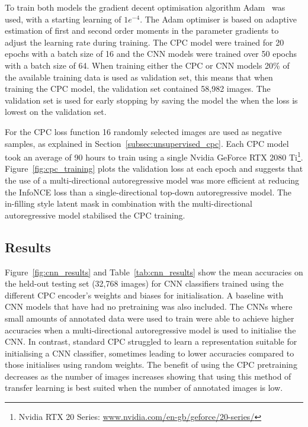 To train both models the gradient decent optimisation algorithm Adam~\citep{kingma2014adam} was used, with a starting learning of $1e^{-4}$. The Adam optimiser is based on adaptive estimation of first and second order moments in the parameter gradients to adjust the learning rate during training. The CPC model were trained for 20 epochs with a batch size of 16 and the CNN models were trained over 50 epochs with a batch size of 64. When training either the CPC or CNN models 20\% of the available training data is used as validation set, this means that when training the CPC model, the validation set contained 58,982 images. The validation set is used for early stopping by saving the model the when the loss is lowest on the validation set. 

For the CPC loss function 16 randomly selected images are used as negative samples, as explained in Section~\ref{subsec:unsupervised_cpc}. Each CPC model took an average of 90 hours to train using a single Nvidia GeForce RTX 2080 Ti\footnote{Nvidia RTX 20 Series: \url{www.nvidia.com/en-gb/geforce/20-series/}}. Figure~\ref{fig:cpc_training} plots the validation loss at each epoch and suggests that the use of a multi-directional autoregressive model was more efficient at reducing the InfoNCE loss than a single-directional top-down autoregressive model. The in-filling style latent mask in combination with the multi-directional autoregressive model stabilised the CPC training.

\subsection{Results}
\label{subsec:unsupervised_results}
Figure~\ref{fig:cnn_results} and Table~\ref{tab:cnn_results} show the mean accuracies on the held-out testing set (32,768 images) for CNN classifiers trained using the different CPC encoder’s weights and biases for initialisation. A baseline with CNN models that have had no pretraining was also included. The CNNs where small amounts of annotated data were used to train were able to achieve higher accuracies when a multi-directional autoregressive model is used to initialise the CNN. In contrast, standard CPC struggled to learn a representation suitable for initialising a CNN classifier, sometimes leading to lower accuracies compared to those initialises using random weights. The benefit of using the CPC pretraining decreases as the number of images increases showing that using this method of transfer learning is best suited when the number of annotated images is low.

